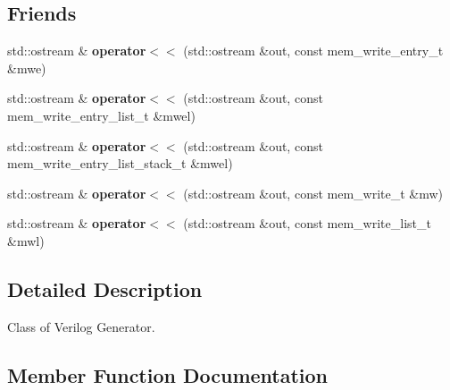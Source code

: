 \subsection*{Friends}
\begin{DoxyCompactItemize}
\item 
\mbox{\label{classilang_1_1_verilog_generator_a3c78b27935e4aeccc185c85dbd8becc9}} 
std\+::ostream \& {\bfseries operator$<$$<$} (std\+::ostream \&out, const mem\+\_\+write\+\_\+entry\+\_\+t \&mwe)
\item 
\mbox{\label{classilang_1_1_verilog_generator_af0f5848d79581e7ef545a7b8cb31d31a}} 
std\+::ostream \& {\bfseries operator$<$$<$} (std\+::ostream \&out, const mem\+\_\+write\+\_\+entry\+\_\+list\+\_\+t \&mwel)
\item 
\mbox{\label{classilang_1_1_verilog_generator_a176a114a2a0d71e8ae324ebe92b792cb}} 
std\+::ostream \& {\bfseries operator$<$$<$} (std\+::ostream \&out, const mem\+\_\+write\+\_\+entry\+\_\+list\+\_\+stack\+\_\+t \&mwel)
\item 
\mbox{\label{classilang_1_1_verilog_generator_a9cc1ee68827bbb9b62d63a3cbdd30a05}} 
std\+::ostream \& {\bfseries operator$<$$<$} (std\+::ostream \&out, const mem\+\_\+write\+\_\+t \&mw)
\item 
\mbox{\label{classilang_1_1_verilog_generator_a8a47dbbc10d44c40ccd9a32a9a465ce4}} 
std\+::ostream \& {\bfseries operator$<$$<$} (std\+::ostream \&out, const mem\+\_\+write\+\_\+list\+\_\+t \&mwl)
\end{DoxyCompactItemize}


\subsection{Detailed Description}
Class of Verilog Generator. 

\subsection{Member Function Documentation}
\mbox{\label{classilang_1_1_verilog_generator_a4680ff4bed22a6d3f91c5054a6ead09e}} 
